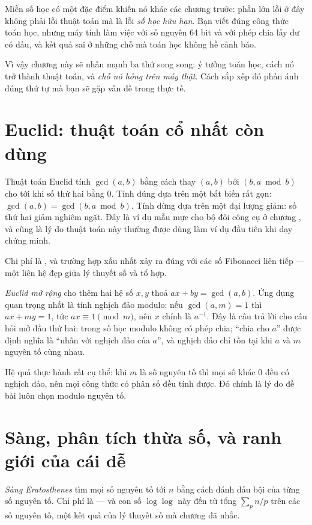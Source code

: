 \documentclass[../../algorithm.tex]{subfiles}
\begin{document}
Miền số học có một đặc điểm khiến nó khác các chương trước: phần lớn lỗi ở đây không phải lỗi thuật toán mà là lỗi \emph{số học hữu hạn}. Bạn viết đúng công thức toán học, nhưng máy tính làm việc với số nguyên 64 bit và với phép chia lấy dư có dấu, và kết quả sai ở những chỗ mà toán học không hề cảnh báo.

Vì vậy chương này sẽ nhấn mạnh ba thứ song song: ý tưởng toán học, cách nó trở thành thuật toán, và \emph{chỗ nó hỏng trên máy thật}. Cách sắp xếp đó phản ánh đúng thứ tự mà bạn sẽ gặp vấn đề trong thực tế.

\section{Euclid: thuật toán cổ nhất còn dùng}

Thuật toán Euclid tính \(\gcd(a,b)\) bằng cách thay \((a,b)\) bởi \((b, a \bmod b)\) cho tới khi số thứ hai bằng 0. Tính đúng dựa trên một bất biến rất gọn: \(\gcd(a,b) = \gcd(b, a \bmod b)\). Tính dừng dựa trên một đại lượng giảm: số thứ hai giảm nghiêm ngặt. Đây là ví dụ mẫu mực cho bộ đôi công cụ ở chương , và cũng là lý do thuật toán này thường được dùng làm ví dụ đầu tiên khi dạy chứng minh.

Chi phí là , và trường hợp xấu nhất xảy ra đúng với các số Fibonacci liên tiếp --- một liên hệ đẹp giữa lý thuyết số và tổ hợp.

\emph{Euclid mở rộng} cho thêm hai hệ số \(x, y\) thoả \(ax + by = \gcd(a,b)\). Ứng dụng quan trọng nhất là tính nghịch đảo modulo: nếu \(\gcd(a,m)=1\) thì \(ax + my = 1\), tức \(ax \equiv 1 \pmod m\), nên \(x\) chính là \(a^{-1}\). Đây là câu trả lời cho câu hỏi mở đầu thứ hai: trong số học modulo không có phép chia; ``chia cho \(a\)'' được định nghĩa là ``nhân với nghịch đảo của \(a\)'', và nghịch đảo chỉ tồn tại khi \(a\) và \(m\) nguyên tố cùng nhau.

Hệ quả thực hành rất cụ thể: khi \(m\) là số nguyên tố thì mọi số khác 0 đều có nghịch đảo, nên mọi công thức có phân số đều tính được. Đó chính là lý do đề bài luôn chọn modulo nguyên tố.

\section{Sàng, phân tích thừa số, và ranh giới của cái dễ}

\emph{Sàng Eratosthenes} tìm mọi số nguyên tố tới \(n\) bằng cách đánh dấu bội của từng số nguyên tố. Chi phí là  --- và con số \(\log\log\) này đến từ tổng \(\sum_p n/p\) trên các số nguyên tố, một kết quả của lý thuyết số mà chương  đã nhắc.
\end{document}
